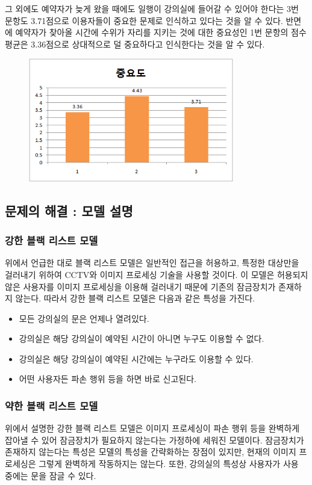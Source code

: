 \documentclass[11pt,a4paper]{article}
\begin{document}
그 외에도 예약자가 늦게 왔을 때에도 일행이 강의실에 들어갈 수 있어야 한다는 3번
문항도 3.71점으로 이용자들이 중요한 문제로 인식하고 있다는 것을 알 수 있다.
반면에 예약자가 찾아올 시간에 수위가 자리를 지키는 것에 대한 중요성인 1번
문항의 점수 평균은 3.36점으로 상대적으로 덜 중요하다고 인식한다는 것을 알 수
있다.
\begin{figure}[H]
\includegraphics[width=0.8\textwidth]{4_1_4}
\centering
\end{figure}


\subsection{문제의 해결 : 모델 설명}

\subsubsection{강한 블랙 리스트 모델}
위에서 언급한 대로 블랙 리스트 모델은 일반적인 접근을 허용하고, 특정한 대상만을
걸러내기 위하여 CCTV와 이미지 프로세싱 기술을 사용할 것이다. 이 모델은 허용되지
않은 사용자를 이미지 프로세싱을 이용해 걸러내기 때문에 기존의 잠금장치가
존재하지 않는다. 따라서 강한 블랙 리스트 모델은 다음과 같은 특성을 가진다.

\begin{itemize}
\item 모든 강의실의 문은 언제나 열려있다.
\item 강의실은 해당 강의실이 예약된 시간이 아니면 누구도 이용할 수 없다.
\item 강의실은 해당 강의실이 예약된 시간에는 누구라도 이용할 수 있다.
\item 어떤 사용자든 파손 행위 등을 하면 바로 신고된다.
\end{itemize}

\subsubsection{약한 블랙 리스트 모델}
위에서 설명한 강한 블랙 리스트 모델은 이미지 프로세싱이 파손 행위 등을 완벽하게
잡아낼 수 있어 잠금장치가 필요하지 않는다는 가정하에 세워진 모델이다.
잠금장치가 존재하지 않는다는 특성은 모델의 특성을 간략화하는 장점이 있지만,
현재의 이미지 프로세싱은 그렇게 완벽하게 작동하지는 않는다. 또한, 강의실의
특성상 사용자가 사용 중에는 문을 잠글 수 있다.
\end{document}
